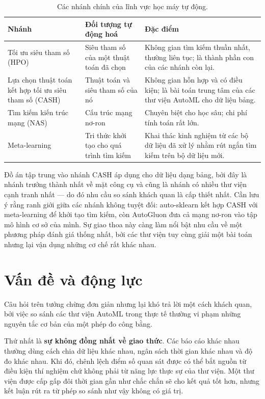 \begin{table}[H]
  \centering
  \small
  \caption{Các nhánh chính của lĩnh vực học máy tự động.}
  \label{tab:nhanh}
  \renewcommand{\arraystretch}{1.25}
  \begin{tabularx}{\linewidth}{@{}>{\raggedright\arraybackslash}p{3.4cm} >{\raggedright\arraybackslash}p{3.6cm} X@{}}
    \toprule
    \textbf{Nhánh} & \textbf{Đối tượng tự động hoá} & \textbf{Đặc điểm} \\
    \midrule
    Tối ưu siêu tham số (HPO) &
    Siêu tham số của một thuật toán đã chọn &
    Không gian tìm kiếm thuần nhất, thường liên tục; là thành phần con của các
    nhánh còn lại. \\
    Lựa chọn thuật toán kết hợp tối ưu siêu tham số (CASH) &
    Thuật toán và siêu tham số của nó &
    Không gian hỗn hợp và có điều kiện; là bài toán trung tâm của các thư viện
    AutoML cho dữ liệu bảng. \\
    Tìm kiếm kiến trúc mạng (NAS) &
    Cấu trúc mạng nơ-ron &
    Chuyên biệt cho học sâu; chi phí tính toán rất lớn. \\
    Meta-learning &
    Tri thức khởi tạo cho quá trình tìm kiếm &
    Khai thác kinh nghiệm từ các bộ dữ liệu đã xử lý nhằm rút ngắn tìm kiếm trên
    bộ dữ liệu mới. \\
    \bottomrule
  \end{tabularx}
\end{table}

Đồ án tập trung vào nhánh CASH áp dụng cho dữ liệu dạng bảng, bởi đây là nhánh
trưởng thành nhất về mặt công cụ và cũng là nhánh có nhiều thư viện cạnh tranh
nhất --- do đó nhu cầu so sánh khách quan là cấp thiết nhất. Cần lưu ý rằng ranh
giới giữa các nhánh không tuyệt đối: auto-sklearn kết hợp CASH với meta-learning
để khởi tạo tìm kiếm, còn AutoGluon đưa cả mạng nơ-ron vào tập mô hình cơ sở của
mình. Sự giao thoa này càng làm nổi bật nhu cầu về một phương pháp đánh giá thống
nhất, bởi các thư viện tuy cùng giải một bài toán nhưng lại vận dụng những cơ chế
rất khác nhau.

\section{Vấn đề và động lực}
\label{sec:dongluc}
Câu hỏi trên tưởng chừng đơn giản nhưng lại khó trả lời một cách khách quan, bởi
việc so sánh các thư viện AutoML trong thực tế thường vi phạm những nguyên tắc cơ
bản của một phép đo công bằng.

Thứ nhất là \textbf{sự không đồng nhất về giao thức}. Các báo cáo khác nhau
thường dùng cách chia dữ liệu khác nhau, ngân sách thời gian khác nhau và độ đo
khác nhau. Khi đó, chênh lệch điểm số quan sát được có thể bắt nguồn từ điều kiện
thí nghiệm chứ không phải từ năng lực thực sự của thư viện. Một thư viện được cấp
gấp đôi thời gian gần như chắc chắn sẽ cho kết quả tốt hơn, nhưng kết luận rút ra
từ phép so sánh như vậy không có giá trị.

